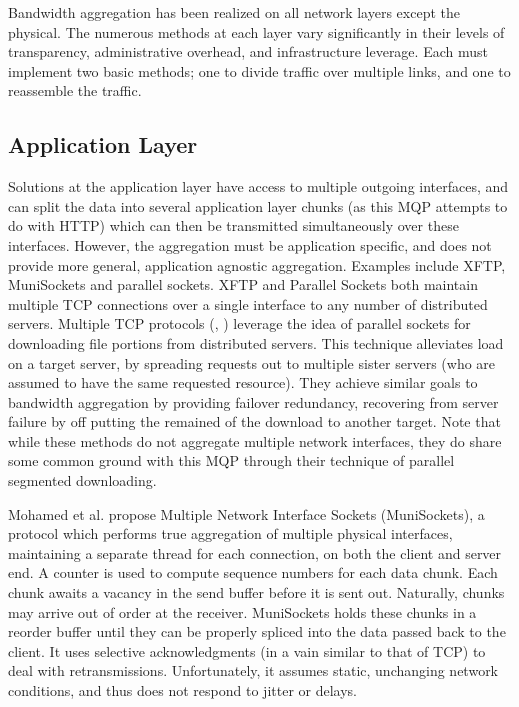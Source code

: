\documentclass[12pt]{article}
\begin{document}
	Bandwidth aggregation has been realized on all network layers except the physical. The numerous methods at each layer vary significantly in their levels of transparency, administrative overhead, and infrastructure leverage. Each must implement two basic methods; one to divide traffic over multiple links, and one to reassemble the traffic.

	\subsection{Application Layer}

		Solutions at the application layer have access to multiple outgoing interfaces, and can split the data into several application layer chunks (as this MQP attempts to do with HTTP) which can then be transmitted simultaneously over these interfaces. However, the aggregation must be application specific, and does not provide more general, application agnostic aggregation. Examples include XFTP, MuniSockets and parallel sockets. XFTP and Parallel Sockets both maintain multiple TCP connections over a single interface to any number of distributed servers\cite{Ramaboli20121674}. Multiple TCP protocols (\cite{1541208}, \cite{4539690}) leverage the idea of parallel sockets for downloading file portions from distributed servers. This technique alleviates load on a target server, by spreading requests out to multiple sister servers (who are assumed to have the same requested resource). They achieve similar goals to bandwidth aggregation by providing failover redundancy, recovering from server failure by off putting the remained of the download to another target. Note that while these methods do not aggregate multiple network interfaces, they do share some common ground with this MQP through their technique of parallel segmented downloading.

		Mohamed et al. propose Multiple Network Interface Sockets (MuniSockets), a protocol which performs true aggregation of multiple physical interfaces, maintaining a separate thread for each connection, on both the client and server end. A counter is used to compute sequence numbers for each data chunk. Each chunk awaits a vacancy in the send buffer before it is sent out. Naturally, chunks may arrive out of order at the receiver. MuniSockets holds these chunks in a reorder buffer until they can be properly spliced into the data passed back to the client. It uses selective acknowledgments (in a vain similar to that of TCP) to deal with retransmissions. Unfortunately, it assumes static, unchanging network conditions, and thus does not respond to jitter or delays\cite{mohamed2002user}.
\end{document}
